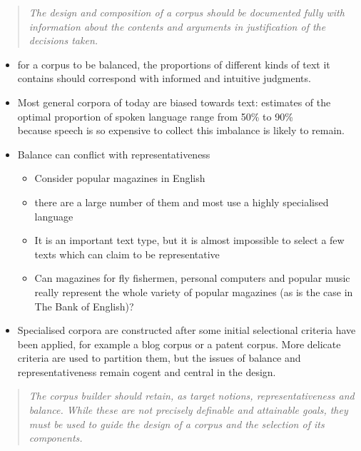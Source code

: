 \documentclass[a4paper,landscape,headrule,footrule,xetex]{foils}
\begin{document}
\begin{quotation}
  \textit{The design and composition of a corpus should be documented fully
  with information about the contents and arguments in justification
  of the decisions taken.}
\end{quotation}


\begin{itemize}
\item for a corpus to be  balanced, the proportions of different kinds of text it contains should correspond with informed and intuitive judgments.
\item Most general corpora of today are biased towards text: estimates of the optimal proportion of spoken language range from 50\% to 90\%
\\ because speech  is so expensive to collect this imbalance is likely to remain.
\item Balance can conflict with representativeness
  \begin{itemize}
  \item Consider popular magazines in English
  \item  there are a large number of them and most use a highly specialised language
  \item It is an important text type, but it is almost impossible to select a few texts which can claim to be representative
  \item Can magazines for fly fishermen, personal computers and popular music really represent the whole variety of popular magazines (as is the case in The Bank of English)?
  \end{itemize}
\item Specialised corpora are constructed after some initial
  selectional criteria have been applied, for example a blog corpus or
  a patent corpus. More delicate criteria are used to partition them,
  but the issues of balance and representativeness remain cogent and
  central in the design.
\end{itemize}

\begin{quotation}
  \textit{The corpus builder should retain, as target notions,
    representativeness and balance. While these are not precisely
    definable and attainable goals, they must be used to guide the
    design of a corpus and the selection of its components.}
\end{quotation}

\end{document}
